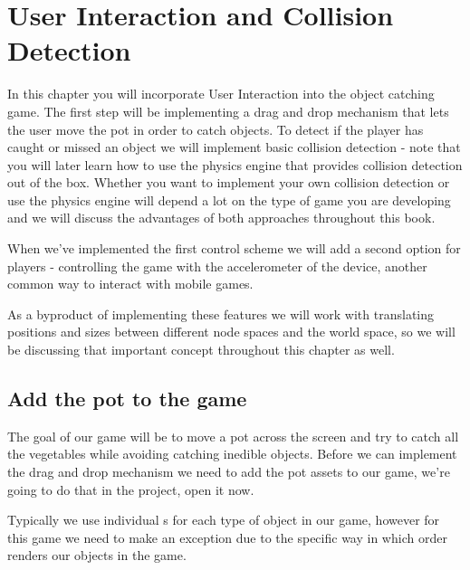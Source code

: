 \chapter{User Interaction and Collision Detection}

In this chapter you will incorporate User Interaction into the object catching
game. The first step will be implementing a drag and drop mechanism that lets
the user move the pot in order to catch objects. To detect if the player has
caught or missed an object we will implement basic collision detection - note
that you will later learn how to use the \cocos{} physics engine that provides
collision detection out of the box. Whether you want to implement your own
collision detection or use the physics engine will depend a lot on the type of
game you are developing and we will discuss the advantages of both approaches
throughout this book.

When we've implemented the first control scheme we will add a second option for
players - controlling the game with the accelerometer of the device, another
common way to interact with mobile games.

As a byproduct of implementing these features we will work with translating
positions and sizes between different node spaces and the world space, so we
will be discussing that important concept throughout this chapter as well.

\section{Add the pot to the game}
The goal of our game will be to move a pot across the screen and try to catch
all the vegetables while avoiding catching inedible objects. Before we can
implement the drag and drop mechanism we need to add the pot assets to our game,
we're going to do that in the \SB{} project, open it now.

Typically we use individual \ccbfile{}s for each type of object in our game,
however for this game we need to make an exception due to the specific way in
which order \cocos{} renders our objects in the game.

